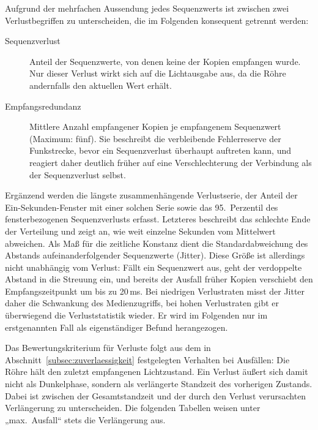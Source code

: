 Aufgrund der mehrfachen Aussendung jedes Sequenzwerts ist zwischen zwei
Verlustbegriffen zu unterscheiden, die im Folgenden konsequent getrennt werden:

\begin{description}
  \item[Sequenzverlust] Anteil der Sequenzwerte, von denen keine der
    Kopien empfangen wurde. Nur dieser Verlust wirkt sich auf die Lichtausgabe
    aus, da die Röhre andernfalls den aktuellen Wert erhält.
  \item[Empfangsredundanz] Mittlere Anzahl empfangener Kopien je
    empfangenem Sequenzwert (Maximum: fünf). Sie beschreibt die
    verbleibende Fehlerreserve der Funkstrecke, bevor ein Sequenzverlust
    überhaupt auftreten kann, und reagiert daher deutlich früher auf eine
    Verschlechterung der Verbindung als der Sequenzverlust selbst.
\end{description}

Ergänzend werden die längste zusammenhängende Verlustserie, der Anteil der
Ein-Sekunden-Fenster mit einer solchen Serie sowie das 95.~Perzentil des
fensterbezogenen Sequenzverlusts erfasst. Letzteres beschreibt das schlechte Ende
der Verteilung und zeigt an, wie weit einzelne Sekunden vom Mittelwert abweichen.
Als Maß für die zeitliche Konstanz dient die Standardabweichung des Abstands
aufeinanderfolgender Sequenzwerte (Jitter). Diese Größe ist allerdings nicht
unabhängig vom Verlust: Fällt ein Sequenzwert aus, geht der verdoppelte Abstand
in die Streuung ein, und bereits der Ausfall früher Kopien verschiebt den
Empfangszeitpunkt um bis zu 20\,ms. Bei niedrigen Verlustraten misst der Jitter
daher die Schwankung des Medienzugriffs, bei hohen Verlustraten gibt er
überwiegend die Verluststatistik wieder. Er wird im Folgenden nur im
erstgenannten Fall als eigenständiger Befund herangezogen.

Das Bewertungskriterium für Verluste folgt aus dem in
Abschnitt~\ref{subsec:zuverlaessigkeit} festgelegten Verhalten bei Ausfällen: Die
Röhre hält den zuletzt empfangenen Lichtzustand. Ein Verlust äußert sich damit
nicht als Dunkelphase, sondern als verlängerte Standzeit des vorherigen Zustands.
Dabei ist zwischen der Gesamtstandzeit und der durch den Verlust verursachten
Verlängerung zu unterscheiden. Die folgenden Tabellen weisen unter
„max.\ Ausfall“ stets die Verlängerung aus.

